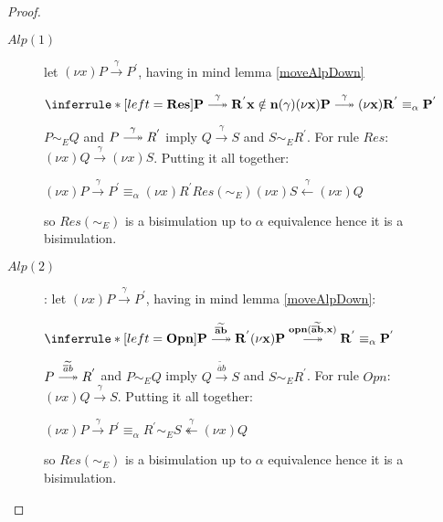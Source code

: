 \begin{lemma}
\begin{proof}
\begin{description}
\begin{description}
 	  \item[$Alp(1)$]
	    let $(\nu x)P \xrightarrow{\gamma} P^{'}$, having in mind lemma \ref{moveAlpDown} 
   	    \begin{center}
   	      $\inferrule* [left=\bf{Res}]{
   		  P \stackrel{\gamma}{\longtwoheadrightarrow} R^{'}
 		\\
 		  x \notin n(\gamma)
   	      }{
   		  (\nu x)P \stackrel{\gamma}{\longtwoheadrightarrow} (\nu x)R^{'} \equiv_{\alpha} P^{'}
   	      }$
   	    \end{center}
 	    $P \sim_{E} Q$ and $P \stackrel{\gamma}{\longtwoheadrightarrow} R^{'}$ imply $Q \xrightarrow{\gamma} S$ and $S\sim_{E} R^{'}$. For rule $Res$: $(\nu x)Q \xrightarrow{\gamma} (\nu x)S$. Putting it all together:
 	    \begin{center}
 	      $(\nu x)P \xrightarrow{\gamma} P^{'} \equiv_{\alpha} (\nu x)R^{'} Res(\sim_{E}) (\nu x)S \stackrel{\gamma}{\leftarrow} (\nu x)Q$
 	    \end{center}
 	    so $Res(\sim_{E})$ is a bisimulation up to $\alpha$ equivalence hence it is a bisimulation.
  	  \item[$Alp(2)$]:
 	    let $(\nu x)P \xrightarrow{\gamma} P^{'}$, having in mind lemma \ref{moveAlpDown}:
 	    \begin{center}
 	      $\inferrule* [left=\bf{Opn}]{
 		P \stackrel{\widetilde{\overline{a}b}}{\longtwoheadrightarrow} R^{'}
 	      }{
 		(\nu x)P \stackrel{opn(\widetilde{\overline{a}b}, x)}{\longtwoheadrightarrow} R^{'} \equiv_{\alpha} P^{'}
 	      }$ 
  	    \end{center}
 	    $P \stackrel{\widetilde{\overline{a}b}}{\longtwoheadrightarrow} R^{'}$ and $P \sim_{E} Q$ imply $Q \xrightarrow{\widetilde{\overline{a}b}} S$ and $S\sim_{E} R^{'}$. For rule $Opn$: $(\nu x)Q \xrightarrow{\gamma} S$. Putting it all together:
 	    \begin{center}
 	      $(\nu x)P \xrightarrow{\gamma} P^{'} \equiv_{\alpha} R^{'} \sim_{E} S \stackrel{\gamma}{\twoheadleftarrow} (\nu x)Q$
 	    \end{center}
 	    so $Res(\sim_{E})$ is a bisimulation up to $\alpha$ equivalence hence it is a bisimulation.

\end{description}
\end{description}
\end{proof}
\end{lemma}

